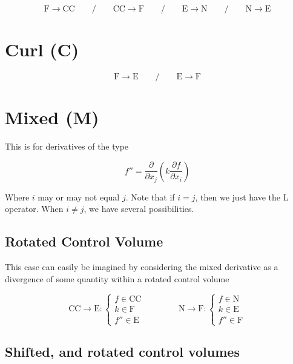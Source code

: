 \documentclass[11pt]{article}
\begin{document}
\begin{equation}
	\text{F} \rightarrow \text{CC}
	\qquad / \qquad
	\text{CC} \rightarrow \text{F}
	\qquad / \qquad
	\text{E} \rightarrow \text{N}
	\qquad / \qquad
	\text{N} \rightarrow \text{E}
\end{equation}

\section{Curl (C)}

\begin{equation}
	\text{F} \rightarrow \text{E}
	\qquad / \qquad
	\text{E} \rightarrow \text{F}
\end{equation}

\section{Mixed (M)}

This is for derivatives of the type

\begin{equation}
	f''
	=
	\frac{\partial}{\partial x_j}
	\left(
	k
	\frac{\partial f}{\partial x_i}
	\right)
\end{equation}

Where $i$ may or may not equal $j$. Note that if $i=j$, then we just have the L operator. When $i\ne j$, we have several possibilities.

\subsection{Rotated Control Volume}
This case can easily be imagined by considering the mixed derivative as a divergence of some quantity within a rotated control volume

\begin{equation}
	\text{CC} \rightarrow \text{E} :
	\begin{cases}
	f \in \text{CC} \\
	k \in \text{F} \\
	f'' \in \text{E}
	\end{cases}
	\qquad \qquad
	\text{N} \rightarrow \text{F} :
	\begin{cases}
	f \in \text{N} \\
	k \in \text{E} \\
	f'' \in \text{F}
	\end{cases}
\end{equation}

\subsection{Shifted, and rotated control volumes}
\end{document}
